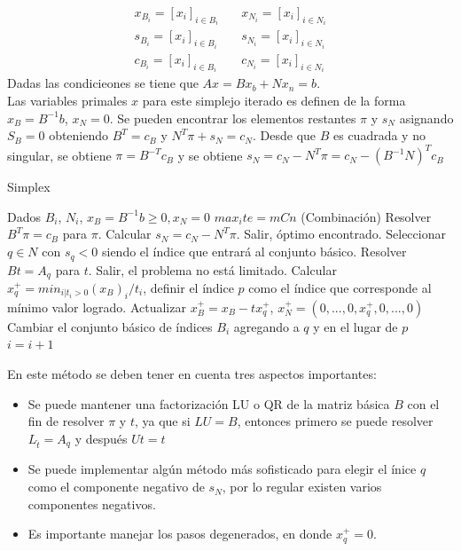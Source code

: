 \begin{equation}
\begin{split}
 x_{B_i} = [x_i]_{i \in B_i} & \quad
 x_{N_i} = [x_i]_{i \in N_i} \\
 s_{B_i} = [x_i]_{i \in B_i} & \quad
 s_{N_i} = [x_i]_{i \in N_i} \\
 c_{B_i} = [x_i]_{i \in B_i} & \quad
 c_{N_i} = [x_i]_{i \in N_i}
\end{split}
\end{equation}
Dadas las condicieones se tiene que $Ax = Bx_b + Nx_n = b$.
\\
Las variables primales $x$ para este simplejo iterado es definen de la forma $x_B = B^{-1} b$, $x_N = 0$.
%
Se pueden encontrar los elementos restantes $\pi$ y $s_N$ asignando $S_B=0$ obteniendo $B^T = c_B$ y $N^T \pi + s_N = c_N$.
%
Desde que $B$ es cuadrada y no singular, se obtiene $\pi = B^{-T} c_B$ y se obtiene $s_N = c_N - N^T \pi = c_N - (B^{-1} N)^T c_B$

\begin{algorithm}[!t]
\caption{Simplex}
\label{alg:Simplex}
\begin{scriptsize}
\begin{algorithmic}[1]
\STATE Dados $B_i$, $N_i$, $x_B = B^{-1}b \geq 0, x_N = 0$
\STATE $max_ite =mCn$ (Combinación)
\STATE Resolver $B^T \pi = c_B$ para $\pi$.
\STATE Calcular $s_N = c_N - N^T \pi$.
   \STATE Salir, óptimo encontrado.
\ENDIF
\STATE Seleccionar $q \in N$ con $s_q < 0$ siendo el índice que entrará al conjunto básico.
\STATE Resolver $B t = A_q$ para $t$.
\STATE Salir, el problema no está limitado.
\ENDIF
\STATE Calcular $x_q^+ = min_{i | t_i > 0} (x_B)_i / t_i$, definir el índice $p$ como el índice que corresponde al mínimo valor logrado.
\STATE Actualizar $x_B^+ = x_B - t x_q^+$, $x_N^+ = (0,...,0,x_q^+,0,...,0)$
\STATE Cambiar el conjunto básico de índices $B_i$ agregando a $q$ y en el lugar de $p$\
\STATE $i = i+1$
\ENDWHILE
\end{algorithmic}
\end{scriptsize}
\end{algorithm}

En este método se deben tener en cuenta tres aspectos importantes:
\begin{itemize}
   \item Se puede mantener una factorización LU o QR de la matriz básica $B$ con el fin de resolver $\pi$ y $t$, ya que si $LU = B$, entonces primero se puede resolver $L_{\hat{t}} = A_q$ y después $Ut = \hat{t}$
   \item Se puede implementar algún método más sofisticado para elegir el ínice $q$ como el componente negativo de $s_N$, por lo regular existen varios componentes negativos.
   \item Es importante manejar los pasos degenerados, en donde $x_q^+=0$.
\end{itemize}

